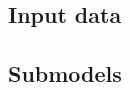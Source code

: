 \documentclass{JASSS}
\begin{document}
\subsection{Input data}
\subsection{Submodels}








\endparano




\end{document}
